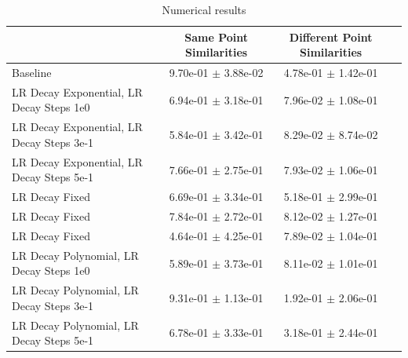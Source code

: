 \documentclass[a4paper]{article}
\begin{document}
\begin{table}[H]
  \caption{Numerical results}
      \begin{tabular}{|l|c|c|c|} \hline
                                      &  Same Point Similarities  &  Different Point Similarities  \\ \hline
Baseline   & 9.70e-01 $\pm$ 3.88e-02 & 4.78e-01 $\pm$ 1.42e-01 \\ \hline
LR Decay Exponential, LR Decay Steps 1e0 & 6.94e-01 $\pm$ 3.18e-01 & 7.96e-02 $\pm$ 1.08e-01 \\ \hline
LR Decay Exponential, LR Decay Steps 3e-1& 5.84e-01 $\pm$ 3.42e-01 & 8.29e-02 $\pm$ 8.74e-02 \\ \hline
LR Decay Exponential, LR Decay Steps 5e-1& 7.66e-01 $\pm$ 2.75e-01 & 7.93e-02 $\pm$ 1.06e-01 \\ \hline
LR Decay Fixed                  & 6.69e-01 $\pm$ 3.34e-01 & 5.18e-01 $\pm$ 2.99e-01 \\ \hline
LR Decay Fixed                   & 7.84e-01 $\pm$ 2.72e-01 & 8.12e-02 $\pm$ 1.27e-01 \\ \hline
LR Decay Fixed                   & 4.64e-01 $\pm$ 4.25e-01 & 7.89e-02 $\pm$ 1.04e-01 \\ \hline
LR Decay Polynomial, LR Decay Steps 1e0  & 5.89e-01 $\pm$ 3.73e-01 & 8.11e-02 $\pm$ 1.01e-01 \\ \hline
LR Decay Polynomial, LR Decay Steps 3e-1 & 9.31e-01 $\pm$ 1.13e-01 & 1.92e-01 $\pm$ 2.06e-01 \\ \hline
LR Decay Polynomial, LR Decay Steps 5e-1 & 6.78e-01 $\pm$ 3.33e-01 & 3.18e-01 $\pm$ 2.44e-01 \\ \hline
      \end{tabular}
      \label{fig:tab1}
\end{table}
\end{document}
